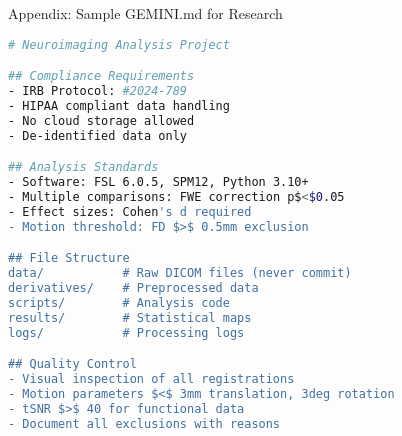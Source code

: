 \documentclass[aspectratio=169]{beamer}
\begin{document}
\begin{frame}[fragile]{Appendix: Sample GEMINI.md for Research}
  \begin{lstlisting}[language=bash, basicstyle=\tiny\ttfamily]
# Neuroimaging Analysis Project

## Compliance Requirements
- IRB Protocol: #2024-789
- HIPAA compliant data handling
- No cloud storage allowed
- De-identified data only

## Analysis Standards
- Software: FSL 6.0.5, SPM12, Python 3.10+
- Multiple comparisons: FWE correction p$<$0.05
- Effect sizes: Cohen's d required
- Motion threshold: FD $>$ 0.5mm exclusion

## File Structure
data/           # Raw DICOM files (never commit)
derivatives/    # Preprocessed data
scripts/        # Analysis code
results/        # Statistical maps
logs/           # Processing logs

## Quality Control
- Visual inspection of all registrations
- Motion parameters $<$ 3mm translation, 3deg rotation
- tSNR $>$ 40 for functional data
- Document all exclusions with reasons
  \end{lstlisting}
\end{frame}
\end{document}
